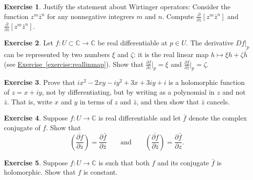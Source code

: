 \documentclass[12pt,openany]{book}
\newcommand{\C}{{\mathbb{C}}}
\theoremstyle{plain}
\theoremstyle{remark}
\theoremstyle{definition}
\newenvironment{exbox}{%
    \def\FrameCommand{\vrule width 1pt \relax\hspace {10pt}}%
    \MakeFramed {\advance \hsize -\width \FrameRestore }%
}{%
    \endMakeFramed
}
\theoremstyle{exercise}
\newtheorem{exercise}{Exercise}[section]
\theoremstyle{example}
\newcommand{\exerciseref}[1]{\hyperref[#1]{Exercise~\ref*{#1}}}
\begin{document}
\begin{exbox}
\begin{exercise}
Justify the statement about Wirtinger operators:  Consider
the function $z^m\bar{z}^n$ for any nonnegative integrers $m$ and $n$.
Compute
$\frac{\partial}{\partial z} \left[ z^m\bar{z}^n \right]$
and
$\frac{\partial}{\partial \bar{z}} \left[ z^m\bar{z}^n \right]$.
\end{exercise}

\begin{exercise}
Let $f \colon U \subset \C \to \C$ be real differentiable at $p \in U$.
The derivative $Df|_{p}$ can be represented by two numbers $\xi$ and
$\zeta$: it is the real linear map $h \mapsto \xi h + \zeta \bar{h}$
(see \exerciseref{exercise:reallinmap}).
Show that $\frac{\partial f}{\partial z} \big|_p = \xi$ and
$\frac{\partial f}{\partial \bar{z}} \big|_p = \zeta$.
\end{exercise}

\begin{exercise}
Prove that $ix^2 - 2xy -iy^2 + 3x + 3iy + i$ is a holomorphic function of
$z = x+iy$, not by
differentiating, but by writing as a polynomial in $z$ and not $\bar{z}$.
That is, write $x$ and $y$ in terms of $z$ and $\bar{z}$, and then show
that $\bar{z}$ cancels.
\end{exercise}

\begin{exercise} \label{exercise:wirtingerandbar}
Suppose $f \colon U \to \C$ is real differentiable and let $\bar{f}$
denote the complex conjugate of $f$.  Show that
\begin{equation*}
\overline{\left(\frac{\partial f}{\partial z}\right)} = 
\frac{\partial \bar{f}}{\partial \bar{z}}
\qquad \text{and} \qquad
\overline{\left(\frac{\partial f}{\partial \bar{z}}\right)} = 
\frac{\partial \bar{f}}{\partial z} .
\end{equation*}
\end{exercise}

\begin{exercise}
Suppose $f \colon U \to \C$ is such that both $f$ and its conjugate
$\bar{f}$ is holomorphic.  Show that $f$ is constant.
\end{exercise}


\end{exbox}
\end{document}
